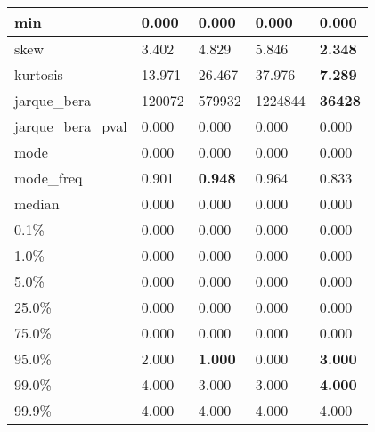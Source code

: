 \begin{table}[H]
\begin{tabular}{|l|m{10em}|m{10em}|m{10em}|m{10em}|}
\hline min & 0.000 & 0.000 & 0.000 & 0.000 \\
\hline skew & 3.402 & 4.829 & \cellcolor[rgb]{0.9, 0.54, 0.52} 5.846 & \bfseries 2.348 \\
\hline kurtosis & 13.971 & 26.467 & \cellcolor[rgb]{0.9, 0.54, 0.52} 37.976 & \bfseries 7.289 \\
\hline jarque\_bera & 120072 & 579932 & \cellcolor[rgb]{0.9, 0.54, 0.52} 1224844 & \bfseries 36428 \\
\hline jarque\_bera\_pval & 0.000 & 0.000 & 0.000 & 0.000 \\
\hline mode & 0.000 & 0.000 & 0.000 & 0.000 \\
\hline mode\_freq & 0.901 & \bfseries 0.948 & 0.964 & \cellcolor[rgb]{0.9, 0.54, 0.52} 0.833 \\
\hline median & 0.000 & 0.000 & 0.000 & 0.000 \\
\hline 0.1\% & 0.000 & 0.000 & 0.000 & 0.000 \\
\hline 1.0\% & 0.000 & 0.000 & 0.000 & 0.000 \\
\hline 5.0\% & 0.000 & 0.000 & 0.000 & 0.000 \\
\hline 25.0\% & 0.000 & 0.000 & 0.000 & 0.000 \\
\hline 75.0\% & 0.000 & 0.000 & 0.000 & 0.000 \\
\hline 95.0\% & 2.000 & \bfseries 1.000 & \cellcolor[rgb]{0.9, 0.54, 0.52} 0.000 & \bfseries 3.000 \\
\hline 99.0\% & 4.000 & \cellcolor[rgb]{0.9, 0.54, 0.52} 3.000 & \cellcolor[rgb]{0.9, 0.54, 0.52} 3.000 & \bfseries 4.000 \\
\hline 99.9\% & 4.000 & 4.000 & 4.000 & 4.000 \\
\hline
\end{tabular}
\end{table}
